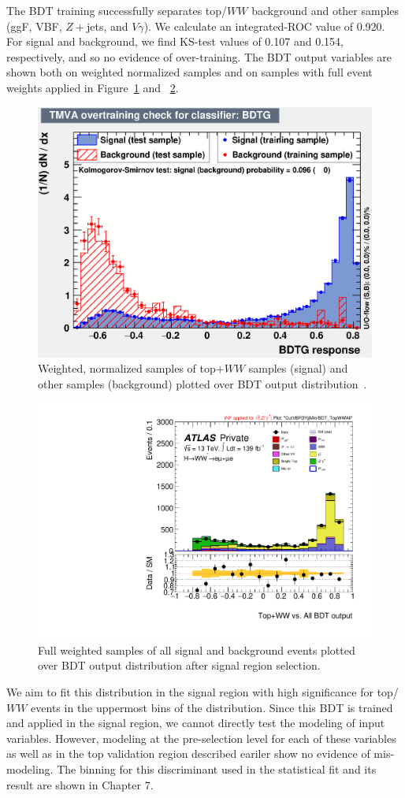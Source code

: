 The BDT training successfully separates top/$WW$ background and other samples (ggF, VBF, $Z+$jets, and $V\gamma$). We calculate an integrated-ROC value of 0.920. For signal and background, we find KS-test values of 0.107 and 0.154, respectively, and so no evidence of over-training. The BDT output variables are shown both on weighted normalized samples and on samples with full event weights applied in Figure~\ref{fig:TopBDTresult} and ~\ref{fig:TopBDTresult2}.

\begin{figure}[!htbp]
\centering
  \includegraphics[width=.45\linewidth]{Pictures/Top+WWvsEverything/overtrain_BDTG.eps}
\caption{Weighted, normalized samples of top$+WW$ samples (signal) and other samples (background) plotted over BDT output distribution~\cite{ourSupportNote}.}
\label{fig:TopBDTresult}
\end{figure}

\begin{figure}[!htbp]
\centering
  \includegraphics[width=.45\linewidth]{Pictures/run2-emme-CutVBFDYjjMin-BDT_TopWWAll-lin.pdf}
\caption{Full weighted samples of all signal and background events plotted over BDT output distribution after signal region selection.}
\label{fig:TopBDTresult2}
\end{figure}

We aim to fit this distribution in the signal region with high significance for top/$WW$ events in the uppermost bins of the distribution. Since this BDT is trained and applied in the signal region, we cannot directly test the modeling of input variables. However, modeling at the pre-selection level for each of these variables as well as in the top validation region described eariler show no evidence of mis-modeling. The binning for this discriminant used in the statistical fit and its result are shown in Chapter 7.

